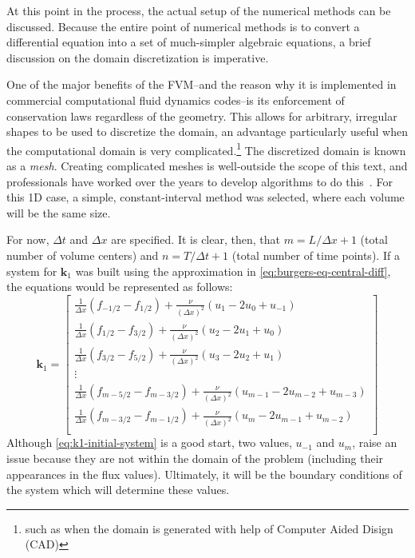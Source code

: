 At this point in the process, the actual setup of the numerical methods can be discussed.
Because the entire point of numerical methods is to convert a differential equation into a set of much-simpler algebraic equations, a brief discussion on the domain discretization is imperative.

One of the major benefits of the FVM--and the reason why it is implemented in commercial computational fluid dynamics codes--is its enforcement of conservation laws regardless of the geometry.
This allows for arbitrary, irregular shapes to be used to discretize the domain, an advantage particularly useful when the computational domain is very complicated.\footnote{such as when the domain is generated with help of Computer Aided Disign (CAD)}
The discretized domain is known as a \textit{mesh}.
Creating complicated meshes is well-outside the scope of this text, and professionals have worked over the years to develop algorithms to do this~\autocite{mazumderNumericalMethodsPartial2016}.
For this 1D case, a simple, constant-interval method was selected, where each volume will be the same size.

For now, $\Delta t$ and $\Delta x$ are specified.
It is clear, then, that $m=L/\Delta x+1$ (total number of volume centers) and $n=T/\Delta t+1$ (total number of time points).
If a system for $\mathbf{k}_1$ was built using the approximation in \cref{eq:burgers-eq-central-diff}, the equations would be represented as follows:
\begin{equation}
    \label{eq:k1-initial-system}
    \mathbf{k}_1 =
    \begin{bmatrix}
        \frac{1}{\Delta x}\left( f_{-1/2}-f_{1/2} \right)+\frac{\nu }{\left( \Delta x \right)^2}\left( u_1-2u_0+u_{-1} \right)\\
        \frac{1}{\Delta x}\left( f_{1/2}-f_{3/2} \right)+\frac{\nu }{\left( \Delta x \right)^2}\left( u_2-2u_1+u_0 \right)\\
        \frac{1}{\Delta x}\left( f_{3/2}-f_{5/2} \right)+\frac{\nu }{\left( \Delta x \right)^2}\left( u_3-2u_2+u_1 \right)\\
        \vdots                                                                                                                             \\
        \frac{1}{\Delta x}\left( f_{m-5/2}-f_{m-3/2} \right)+\frac{\nu }{\left( \Delta x \right)^2}\left( u_{m-1}-2u_{m-2}+u_{m-3} \right)\\
        \frac{1}{\Delta x}\left( f_{m-3/2}-f_{m-1/2} \right)+\frac{\nu }{\left( \Delta x \right)^2}\left( u_{m}-2u_{m-1}+u_{m-2} \right)\\
    \end{bmatrix}
\end{equation}
Although \cref{eq:k1-initial-system} is a good start, two values, $u_{-1}$ and $u_{m}$, raise an issue because they are not within the domain of the problem (including their appearances in the flux values).
Ultimately, it will be the boundary conditions of the system which will determine these values.

